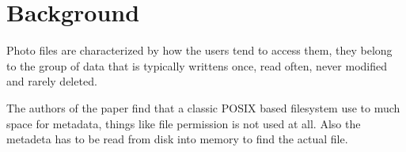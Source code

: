 \section{Background}
Photo files are characterized by how the users tend to access them, they belong to the group of data that is typically writtens once, read often, never modified and rarely deleted.
 

The authors of the paper find that a classic POSIX based filesystem use to much space for metadata, things like file permission is not used at all. Also the metadeta has to be read from disk into memory to find the actual file.




